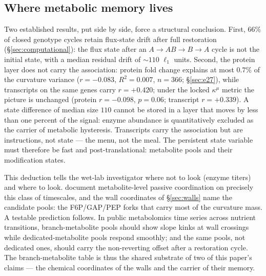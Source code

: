 \documentclass[11pt,a4paper]{article}
\theoremstyle{plain}
\theoremstyle{definition}
\theoremstyle{remark}
\newcommand{\kmu}{\kappa^{\mu}}
\begin{document}
\subsection{Where metabolic memory lives}\label{sec:memory}

Two established results, put side by side, force a structural
conclusion. First, $66\%$ of closed genotype cycles retain
flux-state drift after full restoration (\S\ref{sec:computational}):
the flux state after an $A \to AB \to B \to A$ cycle is not the
initial state, with a median residual drift of $\sim 110$ $\ell_1$
units. Second, the protein layer does not carry the association:
protein fold change explains at most $0.7\%$ of the curvature
variance ($r = -0.083$, $R^2 = 0.007$, $n = 366$;
\S\ref{sec:e27}), while transcripts on the same genes carry $r =
+0.420$; under the locked $\kmu$ metric the picture is unchanged
(protein $r = -0.098$, $p = 0.06$; transcript $r = +0.339$). A
state difference of median size $110$ cannot be stored
in a layer that moves by less than one percent of the signal:
enzyme abundance is quantitatively excluded as the carrier of
metabolic hysteresis. Transcripts carry the association but are
instructions, not state --- the menu, not the meal. The persistent
state variable must therefore be fast and post-translational:
metabolite pools and their modification states.

This deduction tells the wet-lab investigator where not to look
(enzyme titers) and where to look. \citet{kochanowski2013}
document metabolite-level passive coordination on precisely this
class of timescales, and the wall coordinates of
\S\ref{sec:walls} name the candidate pools: the
F6P/GAP/PEP forks that carry most of the curvature mass. A
testable prediction follows. In public metabolomics time series
across nutrient transitions, branch-metabolite pools should show
slope kinks at wall crossings while dedicated-metabolite pools
respond smoothly; and the same pools, not dedicated ones, should
carry the non-reverting offset after a restoration cycle. The
branch-metabolite table is thus the shared substrate of two of
this paper's claims --- the chemical coordinates of the walls and
the carrier of their memory.
\end{document}
